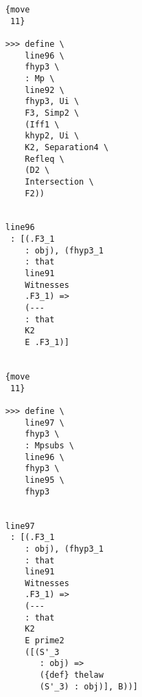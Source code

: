\documentclass[12pt]{article}
\begin{document}
\begin{verbatim}
                                    {move 
                                     11}

                                    >>> define \
                                        line96 \
                                        fhyp3 \
                                        : Mp \
                                        line92 \
                                        fhyp3, Ui \
                                        F3, Simp2 \
                                        (Iff1 \
                                        khyp2, Ui \
                                        K2, Separation4 \
                                        Refleq \
                                        (D2 \
                                        Intersection \
                                        F2))


                                    line96 
                                     : [(.F3_1 
                                        : obj), (fhyp3_1 
                                        : that 
                                        line91 
                                        Witnesses 
                                        .F3_1) => 
                                        (--- 
                                        : that 
                                        K2 
                                        E .F3_1)]


                                    {move 
                                     11}

                                    >>> define \
                                        line97 \
                                        fhyp3 \
                                        : Mpsubs \
                                        line96 \
                                        fhyp3 \
                                        line95 \
                                        fhyp3


                                    line97 
                                     : [(.F3_1 
                                        : obj), (fhyp3_1 
                                        : that 
                                        line91 
                                        Witnesses 
                                        .F3_1) => 
                                        (--- 
                                        : that 
                                        K2 
                                        E prime2 
                                        ([(S'_3 
                                           : obj) => 
                                           ({def} thelaw 
                                           (S'_3) : obj)], B))]



\end{verbatim}
\end{document}
